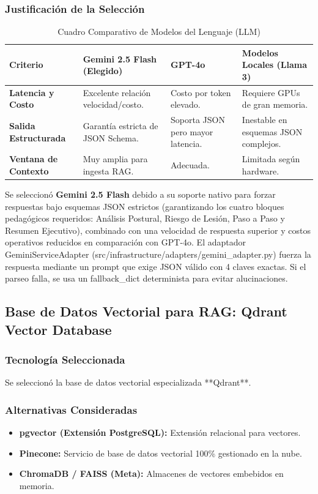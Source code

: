 \subsubsection{Justificación de la Selección}
\begin{table}[htbp]
\centering
\small
\begin{tabularx}{\textwidth}{|>{\bfseries}l|X|X|X|}
    \hline
    Criterio & Gemini 2.5 Flash (Elegido) & GPT-4o & Modelos Locales (Llama 3) \\ \hline
    Latencia y Costo & Excelente relación velocidad/costo. & Costo por token elevado. & Requiere GPUs de gran memoria. \\ \hline
    Salida Estructurada & Garantía estricta de JSON Schema. & Soporta JSON pero mayor latencia. & Inestable en esquemas JSON complejos. \\ \hline
    Ventana de Contexto & Muy amplia para ingesta RAG. & Adecuada. & Limitada según hardware. \\ \hline
\end{tabularx}
\caption{Cuadro Comparativo de Modelos del Lenguaje (LLM)}
\label{tab:comp_llm}
\end{table}

Se seleccionó \textbf{Gemini 2.5 Flash} debido a su soporte nativo para forzar respuestas bajo esquemas JSON estrictos (garantizando los cuatro bloques pedagógicos requeridos: Análisis Postural, Riesgo de Lesión, Paso a Paso y Resumen Ejecutivo), combinado con una velocidad de respuesta superior y costos operativos reducidos en comparación con GPT-4o. El adaptador GeminiServiceAdapter (src/infrastructure/adapters/gemini\_adapter.py) fuerza la respuesta mediante un prompt que exige JSON válido con 4 claves exactas. Si el parseo falla, se usa un fallback\_dict determinista para evitar alucinaciones.

\subsection{Base de Datos Vectorial para RAG: Qdrant Vector Database}

\subsubsection{Tecnología Seleccionada}
Se seleccionó la base de datos vectorial especializada **Qdrant**.

\subsubsection{Alternativas Consideradas}
\begin{itemize}
    \item \textbf{pgvector (Extensión PostgreSQL):} Extensión relacional para vectores.
    \item \textbf{Pinecone:} Servicio de base de datos vectorial 100\% gestionado en la nube.
    \item \textbf{ChromaDB / FAISS (Meta):} Almacenes de vectores embebidos en memoria.
\end{itemize}

